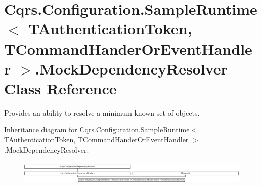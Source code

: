 \hypertarget{classCqrs_1_1Configuration_1_1SampleRuntime_1_1MockDependencyResolver}{}\section{Cqrs.\+Configuration.\+Sample\+Runtime$<$ T\+Authentication\+Token, T\+Command\+Hander\+Or\+Event\+Handler $>$.Mock\+Dependency\+Resolver Class Reference}
\label{classCqrs_1_1Configuration_1_1SampleRuntime_1_1MockDependencyResolver}


Provides an ability to resolve a minimum known set of objects.  


Inheritance diagram for Cqrs.\+Configuration.\+Sample\+Runtime$<$ T\+Authentication\+Token, T\+Command\+Hander\+Or\+Event\+Handler $>$.Mock\+Dependency\+Resolver\+:\begin{figure}[H]
\begin{center}
\leavevmode
\includegraphics[height=1.163435cm]{classCqrs_1_1Configuration_1_1SampleRuntime_1_1MockDependencyResolver}
\end{center}
\end{figure}
